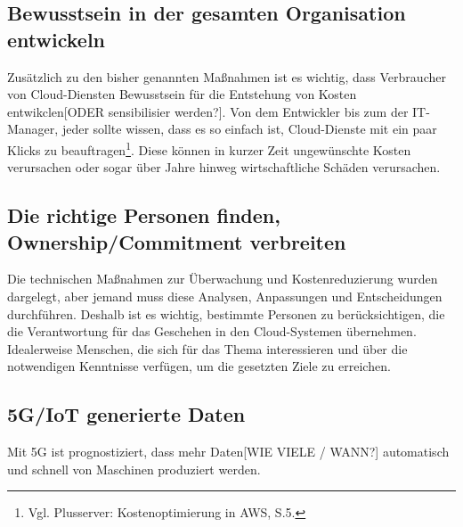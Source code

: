 \subsection*{Bewusstsein in der gesamten Organisation entwickeln}
Zusätzlich zu den bisher genannten Maßnahmen ist es wichtig, dass Verbraucher von Cloud-Diensten Bewusstsein für die Entstehung von Kosten entwikclen[ODER sensibilisier werden?]. Von dem Entwickler bis zum der IT-Manager, jeder sollte wissen, dass es so einfach ist, Cloud-Dienste mit ein paar Klicks zu beauftragen\footnote{Vgl. Plusserver: Kostenoptimierung in AWS, S.5\cite{PS1}.}. Diese können in kurzer Zeit ungewünschte  Kosten verursachen oder sogar über Jahre hinweg wirtschaftliche Schäden verursachen. 
\\
\subsection*{Die richtige Personen finden, Ownership/Commitment verbreiten}
Die technischen Maßnahmen zur Überwachung und Kostenreduzierung wurden dargelegt, aber jemand muss diese Analysen, Anpassungen und Entscheidungen durchführen. 
Deshalb ist es wichtig, bestimmte Personen zu berücksichtigen, die die Verantwortung für das Geschehen in den Cloud-Systemen übernehmen. Idealerweise Menschen, die sich für das Thema interessieren und über die notwendigen Kenntnisse verfügen, um die gesetzten Ziele zu erreichen. 
\\
\subsection*{5G/IoT generierte Daten}
Mit 5G ist prognostiziert, dass mehr Daten[WIE VIELE / WANN?] automatisch und schnell von Maschinen produziert werden.
\\
